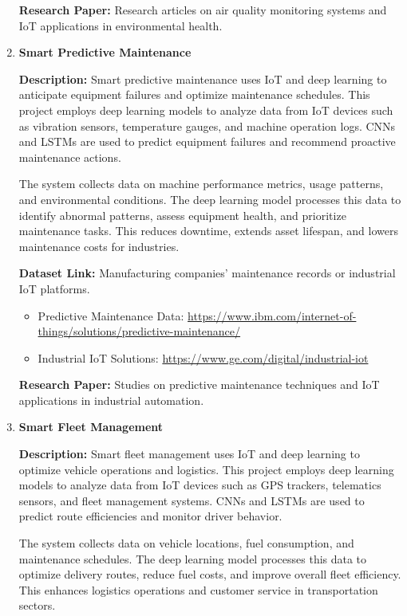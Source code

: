 \documentclass{article}
\begin{document}
\begin{enumerate}[label=\textbf{\arabic*.}, leftmargin=*]
\textbf{Research Paper:} Research articles on air quality monitoring systems and IoT applications in environmental health.

\item \textbf{Smart Predictive Maintenance}

\textbf{Description:}
Smart predictive maintenance uses IoT and deep learning to anticipate equipment failures and optimize maintenance schedules. This project employs deep learning models to analyze data from IoT devices such as vibration sensors, temperature gauges, and machine operation logs. CNNs and LSTMs are used to predict equipment failures and recommend proactive maintenance actions.

The system collects data on machine performance metrics, usage patterns, and environmental conditions. The deep learning model processes this data to identify abnormal patterns, assess equipment health, and prioritize maintenance tasks. This reduces downtime, extends asset lifespan, and lowers maintenance costs for industries.

\textbf{Dataset Link:} Manufacturing companies' maintenance records or industrial IoT platforms.
\begin{itemize}
    \item Predictive Maintenance Data: \url{https://www.ibm.com/internet-of-things/solutions/predictive-maintenance/}
    \item Industrial IoT Solutions: \url{https://www.ge.com/digital/industrial-iot}
\end{itemize}

\textbf{Research Paper:} Studies on predictive maintenance techniques and IoT applications in industrial automation.

\item \textbf{Smart Fleet Management}

\textbf{Description:}
Smart fleet management uses IoT and deep learning to optimize vehicle operations and logistics. This project employs deep learning models to analyze data from IoT devices such as GPS trackers, telematics sensors, and fleet management systems. CNNs and LSTMs are used to predict route efficiencies and monitor driver behavior.

The system collects data on vehicle locations, fuel consumption, and maintenance schedules. The deep learning model processes this data to optimize delivery routes, reduce fuel costs, and improve overall fleet efficiency. This enhances logistics operations and customer service in transportation sectors.


\end{enumerate}
\end{document}
